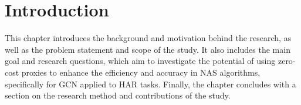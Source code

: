 \chapter{Introduction}
This chapter introduces the background and motivation behind the research, as well as the problem statement and scope of the study. It also includes the main goal and research questions, which aim to investigate the potential of using zero-cost proxies to enhance the efficiency and accuracy in \gls{NAS} algorithms, specifically for \gls{GCN} applied to \gls{HAR} tasks. Finally, the chapter concludes with a section on the research method and contributions of the study.









